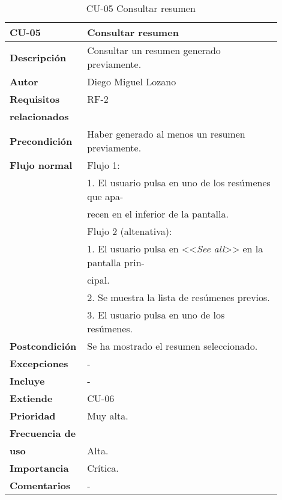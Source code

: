 \begin{longtable}{>{\raggedright}b{0.2\linewidth}>{\raggedright\arraybackslash}b{0.7\linewidth}}
	\toprule
	\textbf{CU-05} & \textbf{Consultar resumen} \\
	\toprule
	\endhead
	
	\toprule
	\caption{CU-05 Consultar resumen}
	\endfoot
	
	\small{\textbf{Descripción}} & Consultar un resumen generado previamente. \\
	\small{\textbf{Autor}} & Diego Miguel Lozano \\
	\small{\textbf{Requisitos}} & RF-2  \\
	\small{\textbf{relacionados}} & \\
	\small{\textbf{Precondición}} &  Haber generado al menos un resumen previamente. \\
	\small{\textbf{Flujo normal}} & \small{Flujo 1:} \\
	& \quad \small{1. El usuario pulsa en uno de los resúmenes que apa-} \\
	& \qquad \small{recen en el inferior de la pantalla.} \\
	& \small{Flujo 2 (altenativa):} \\
	& \quad \small{1. El usuario pulsa en <<\emph{See all}>> en la pantalla prin-} \\
	& \qquad \small{cipal.} \\
	& \quad \small{2. Se muestra la lista de resúmenes previos.} \\
	& \quad \small{3. El usuario pulsa en uno de los resúmenes.} \\
	\small{\textbf{Postcondición}} & Se ha mostrado el resumen seleccionado. \\
	\small{\textbf{Excepciones}} & - \\
	\small{\textbf{Incluye}} & -\\
	\small{\textbf{Extiende}} & CU-06 \\
	\small{\textbf{Prioridad}} & Muy alta. \\
	\small{\textbf{Frecuencia de}} & \\
	\small{\textbf{uso}} & Alta. \\
	\small{\textbf{Importancia}} & Crítica. \\
	\small{\textbf{Comentarios}} & - \\
\end{longtable}


